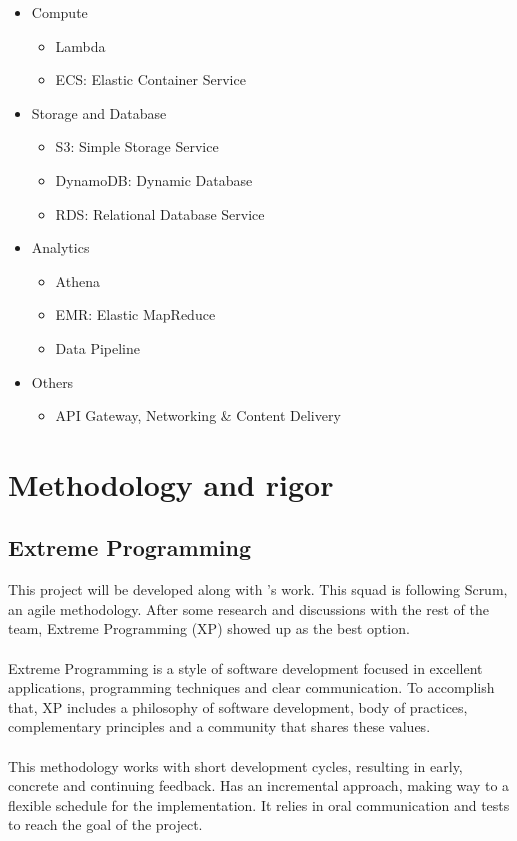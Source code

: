 \begin{itemize}
    \item Compute
    \begin{itemize}
        \item Lambda
        \item ECS: Elastic Container Service
    \end{itemize}
    \item Storage and Database
    \begin{itemize}
        \item S3: Simple Storage Service
        \item DynamoDB: Dynamic Database
        \item RDS: Relational Database Service
    \end{itemize}
    \item Analytics
    \begin{itemize}
        \item Athena
        \item EMR: Elastic MapReduce
        \item Data Pipeline
    \end{itemize}
    \item Others
    \begin{itemize}
        \item API Gateway, Networking \& Content Delivery
    \end{itemize}
\end{itemize}


\section{Methodology and rigor} \label{methodology_rigor}

\subsection{Extreme Programming} \label{xp}

This project will be developed along with \squad's work. This squad is following Scrum, an agile methodology. After some research and discussions with the rest of the team, Extreme Programming (XP)\cite{xp} showed up as the best option.
\\\\
Extreme Programming is a style of software development focused in excellent applications, programming techniques and clear communication. To accomplish that, XP includes a philosophy of software development, body of practices, complementary principles and a community that shares these values.
\\\\
This methodology works with short development cycles, resulting in early, concrete and continuing feedback. Has an incremental approach, making way to a flexible schedule for the implementation. It relies in oral communication and tests to reach the goal of the project.


